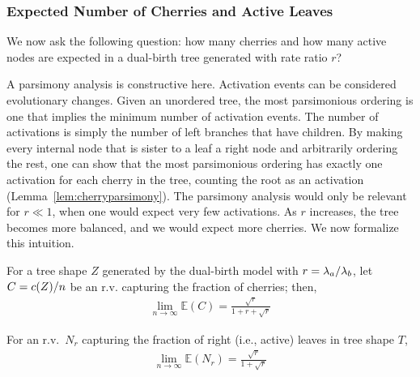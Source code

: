 \subsubsection{Expected Number of Cherries and Active Leaves}\label{sec:cherries}
We now ask the following question: how many cherries and how many active nodes are expected in a dual-birth tree generated with rate ratio $r$?

A parsimony analysis is constructive here. Activation events can be considered evolutionary changes. Given an unordered tree, the most parsimonious ordering is one that implies the minimum number of activation events. The number of activations is simply the number of left branches that have children. By making every internal node that is sister to a leaf a right node and arbitrarily ordering the rest, one can show that the most parsimonious ordering has exactly one activation for each cherry in the tree, counting the root as an activation (Lemma~\ref{lem:cherryparsimony}). The parsimony analysis would only be relevant for $r\ll1$, when one would expect very few activations. As $r$ increases, the tree becomes more balanced, and we would expect more cherries. We now formalize this intuition.

\begin{theorem}\label{thm:cherr}
For a tree shape $Z$ generated by the dual-birth model with $r=\lambda_a/\lambda_b$, let $C=c(Z)/n$ be an r.v. capturing the fraction of cherries; then, 
\begin{align}\label{eq:cherries}
\lim_{n\to\infty}\mathbb{E}(C) = \frac{\sqrt{r}}{1+r+\sqrt{r}}
\end{align}
\end{theorem}

\begin{corollary}\label{cor:rbh}
For an r.v.\ $N_r$ capturing the fraction of right (i.e., active) leaves in tree shape $T$,
\begin{align}\label{eq:nr}
\lim_{n\to\infty}\mathbb{E}(N_r) = \frac{\sqrt{r}}{1+\sqrt{r}}
\end{align}
\end{corollary}

